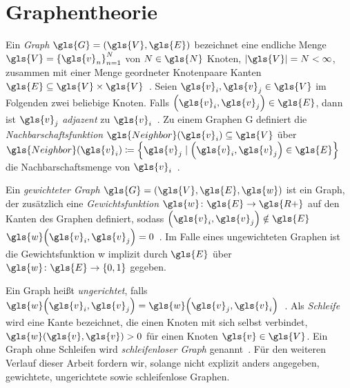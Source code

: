 \section{Graphentheorie}
\label{graphentheorie}

Ein \emph{Graph} $\gls{G} = \left(\gls{V}, \gls{E}\right)$ bezeichnet eine endliche Menge $\gls{V} = {\left\{ \gls{v}_n \right\}}^N_{n=1}$ von $N \in \gls{N}$ Knoten, $\left| \gls{V} \right| = N < \infty$, zusammen mit einer Menge geordneter Knotenpaare \bzw{} Kanten $\gls{E} \subseteq \gls{V} \times \gls{V}$~\cite{Biggs}.
Seien $\gls{v}_i, \gls{v}_j \in \gls{V}$ im Folgenden zwei beliebige Knoten.
Falls $\left( \gls{v}_i, \gls{v}_j \right) \in \gls{E}$, dann ist $\gls{v}_j$ \emph{adjazent} zu $\gls{v}_i$~\cite{Biggs}.
Zu einem Graphen \gls{G} definiert die \emph{Nachbarschaftsfunktion} $\gls{Neighbor}\left(\gls{v}_i\right) \subseteq \gls{V}$ über $\gls{Neighbor}\left(\gls{v}_i\right) \coloneqq \left\{\gls{v}_j \mid \left(\gls{v}_i, \gls{v}_j\right) \in \gls{E}\right\}$ die Nachbarschaftsmenge von $\gls{v}_i$~\cite{Shuman}.

Ein \emph{gewichteter Graph} $\gls{G} = \left(\gls{V}, \gls{E}, \gls{w}\right)$ ist ein Graph, der zusätzlich eine \emph{Gewichtsfunktion} $\gls{w} \colon \gls{E} \to \gls{R+}$ auf den Kanten des Graphen definiert, sodass $\left( \gls{v}_i, \gls{v}_j  \right) \notin \gls{E}$ \gdw{} $\gls{w}\left(\gls{v}_i, \gls{v}_j\right) = 0$~\cite{Biggs}.
Im Falle eines ungewichteten Graphen ist die Gewichtsfunktion \gls{w} implizit durch $\gls{E}$ über $\gls{w} \colon \gls{E} \to \left\{ 0, 1 \right\}$ gegeben.

Ein Graph heißt \emph{ungerichtet}, falls $\gls{w}\left(\gls{v}_i, \gls{v}_j\right) = \gls{w}\left(\gls{v}_j, \gls{v}_i\right)$~\cite{Biggs}.
Als \emph{Schleife} wird eine Kante bezeichnet, die einen Knoten mit sich selbst verbindet, \dhe{} $\gls{w}\left(\gls{v}, \gls{v}\right) > 0$ für einen Knoten $\gls{v} \in \gls{V}$.
Ein Graph ohne Schleifen wird \emph{schleifenloser Graph} genannt~\cite{Biggs}.
Für den weiteren Verlauf dieser Arbeit fordern wir, solange nicht explizit anders angegeben, gewichtete, ungerichtete sowie schleifenlose Graphen.

